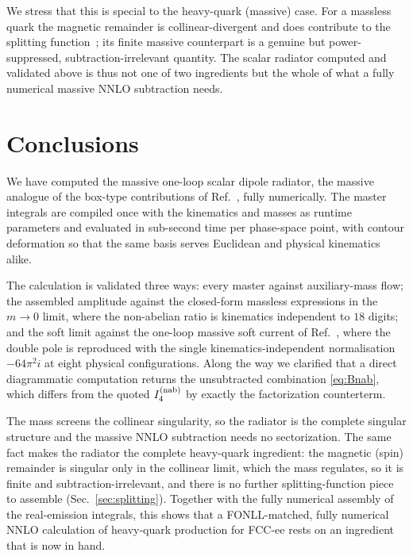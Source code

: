 \documentclass[11pt,a4paper]{article}
\begin{document}
We stress that this is special to the heavy-quark (massive) case. For a massless
quark the magnetic remainder is collinear-divergent and does contribute to the
splitting function~\cite{Campbell:2025}; its finite massive counterpart is a
genuine but power-suppressed, subtraction-irrelevant quantity. The scalar radiator
computed and validated above is thus not one of two ingredients but the whole of
what a fully numerical massive NNLO subtraction needs.

\section{Conclusions}
\label{sec:conclusions}
We have computed the massive one-loop scalar dipole radiator, the massive
analogue of the box-type contributions of Ref.~\cite{Campbell:2025}, fully
numerically. The master integrals are compiled once with the kinematics and
masses as runtime parameters and evaluated in sub-second time per phase-space
point, with contour deformation so that the same basis serves Euclidean and
physical kinematics alike.

The calculation is validated three ways: every master against auxiliary-mass
flow; the assembled amplitude against the closed-form massless expressions in the
$m\to0$ limit, where the non-abelian ratio is kinematics independent to $18$
digits; and the soft limit against the one-loop massive soft current of
Ref.~\cite{BCM}, where the double pole is reproduced with the single
kinematics-independent normalisation $-64\pi^2 i$ at eight physical
configurations. Along the way we clarified that a direct diagrammatic computation
returns the unsubtracted combination \eqref{eq:Bnab}, which differs from the
quoted $I_4^{\rm(nab)}$ by exactly the factorization counterterm.

The mass screens the collinear singularity, so the radiator is the complete
singular structure and the massive NNLO subtraction needs no sectorization. The
same fact makes the radiator the complete heavy-quark ingredient: the
magnetic (spin) remainder is singular only in the collinear limit, which the mass
regulates, so it is finite and subtraction-irrelevant, and there is no further
splitting-function piece to assemble (Sec.~\ref{sec:splitting}). Together with the
fully numerical assembly of the real-emission integrals, this shows that a
FONLL-matched, fully numerical NNLO calculation of heavy-quark production for
FCC-ee rests on an ingredient that is now in hand.
\end{document}
